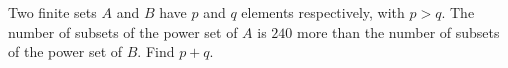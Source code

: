 Two finite sets $A$ and $B$ have $p$ and $q$ elements respectively, with $p>q$. The number of subsets of the power set of $A$ is $240$ more than the number of subsets of the power set of $B$. Find $p+q$.
